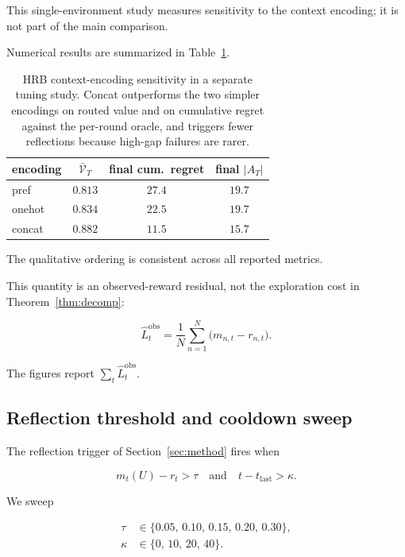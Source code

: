 \documentclass{article} %
\begin{document}
This single-environment study measures sensitivity to the context encoding; it is not part of the main comparison.

Numerical results are summarized in Table~\ref{tab:app-ctx-type}.

\begin{table}[h]
\centering
\small
\caption{HRB context-encoding sensitivity in a separate tuning study. Concat outperforms the two simpler encodings on routed value and on cumulative regret against the per-round oracle, and triggers fewer reflections because high-gap failures are rarer.}
\label{tab:app-ctx-type}
\begin{tabular}{lccc}
\toprule
encoding & $\bar{\mathcal{V}}_T$ & final cum.\ regret & final $|A_T|$ \\
\midrule
pref     & $0.813$ & $27.4$ & $19.7$ \\
onehot   & $0.834$ & $22.5$ & $19.7$ \\
concat   & $0.882$ & $11.5$ & $15.7$ \\
\bottomrule
\end{tabular}

\end{table}

The qualitative ordering is consistent across all reported metrics.

This quantity is an observed-reward residual, not the exploration cost in
Theorem~\ref{thm:decomp}:

\begin{equation}
\label{eq:app-emp-LT-recap}
\hat L_t^{\mathrm{obs}}
=
\frac{1}{N}\sum_{n=1}^{N}\big(m_{n,t}-r_{n,t}\big).
\end{equation}

The figures report \(\sum_t\hat L_t^{\mathrm{obs}}\).

\subsection{Reflection threshold and cooldown sweep}

\label{app:reflection-sweep}

The reflection trigger of Section~\ref{sec:method} fires when

\begin{equation}
\label{eq:app-trigger-recap}
m_t(U)-r_t > \tau \quad\text{and}\quad t-t_{\text{last}}>\kappa.
\end{equation}

We sweep

\begin{align}
\label{eq:app-tau-grid}
\tau &\in \{0.05,\,0.10,\,0.15,\,0.20,\,0.30\},\\
\label{eq:app-kappa-grid}
\kappa &\in \{0,\,10,\,20,\,40\}.
\end{align}
\end{document}
